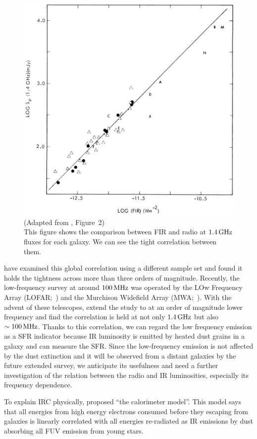\begin{figure}[htbp]
	\centering
	\includegraphics[width=.6\linewidth]{Chapter_1/Figures/Helou1985_Figure2.png}
    \caption[Adapted from \citet{Helou1985} (Figure~2)]{\label{fig:Helou1985_figure2}
        (Adapted from \citet{Helou1985}, Figure~2)\\
        This figure shows the comparison between FIR and radio at $1.4\,\mathrm{GHz}$ fluxes for each galaxy.
        We can see the tight correlation between them.
    }
\end{figure}

\citet{Condon1991a,Yun2001a, Bell2003} have examined this global correlation using a different sample set and found it holds the tightness across more than three orders of magnitude.
Recently, the low-frequency survey at around $100\,\mathrm{MHz}$ was operated by the LOw Frequency Array (LOFAR;~\citealt{VanHaarlem2013}) and the Murchison Widefield Array (MWA;~\citealt{Tingay2013a}).
With the advent of these telescopes, \citet{CalistroRivera2017a, Read2018, Wang2019} extend the study to at an order of magnitude lower frequency and find the correlation is held at not only $1.4\,\mathrm{GHz}$ but also $\sim 100\,\mathrm{MHz}$.
Thanks to this correlation, we can regard the low frequency emission as a SFR indicator because IR luminosity is emitted by heated dust grains in a galaxy and can measure the SFR\@.
Since the low-frequency emission is not affected by the dust extinction \citep{Yun2001a, Murphy2011} and it will be observed from a distant galaxies by the future extended survey, we anticipate its usefulness and need a further investigation of the relation between the radio and IR luminosities, especially its frequency dependence.

To explain IRC physically, \citet{Volk1989} proposed ``the calorimeter model''.
This model says that all energies from high energy electrons consumed before they escaping from galaxies is linearly correlated with all energies re-radiated as IR emissions by dust absorbing all FUV emission from young stars.

